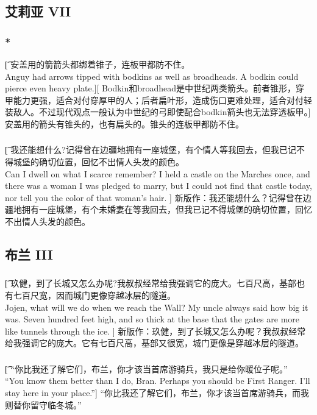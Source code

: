 \documentclass[12pt,a4paper]{article}
\begin{document}
\subsection{艾莉亚 VII}
\subsubsection{\color{red}*}\t[
	安盖用的箭箭头都绑着锥子，连板甲都防不住。\\
	Anguy had arrows tipped with bodkins as well as broadheads. A bodkin could pierce even heavy plate.][
	Bodkin和broadhead是中世纪两类箭头。前者锥形，穿甲能力更强，适合对付穿厚甲的人；后者扁叶形，造成伤口更难处理，适合对付轻装敌人。不过现代观点一般认为中世纪的弓即使配合bodkin箭头也无法穿透板甲。]
	安盖用的箭头有锥头的，也有扁头的。锥头的连板甲都防不住。
	
\subsubsection{}\t[
	我还能想什么?记得曾在边疆地拥有一座城堡，有个情人等我回去，但我已记不得城堡的确切位置，回忆不出情人头发的颜色。\\
	Can I dwell on what I scarce remember? I held a castle on the Marches once, and there was a woman I was pledged to marry, but I could not find that castle today, nor tell you the color of that woman's hair. ]
	新版作：我还能想什么？记得曾在边疆地拥有一座城堡，有个未婚妻在等我回去，但我已记不得城堡的确切位置，回忆不出情人头发的颜色。
	

\subsection{布兰 III}
\subsubsection{}\t[
	 玖健，到了长城又怎么办呢?我叔叔经常给我强调它的庞大。七百尺高，基部也有七百尺宽，因而城门更像穿越冰层的隧道。\\
	 Jojen, what will we do when we reach the Wall? My uncle always said how big it was. Seven hundred feet high, and so thick at the base that the gates are more like tunnels through the ice. ]
	 新版作：玖健，到了长城又怎么办呢？我叔叔经常给我强调它的庞大。它有七百尺高，基部又很宽，城门更像是穿越冰层的隧道。
	 
\subsubsection{}\t[
	 “你比我还了解它们，布兰，你才该当首席游骑兵，我只是给你暖位子呢。” \\
	 “You know them better than I do, Bran. Perhaps you should be First Ranger. I'll stay here in your place.”]
	 “你比我还了解它们，布兰，你才该当首席游骑兵，而我则替你留守临冬城。” 
	 
\end{document}
